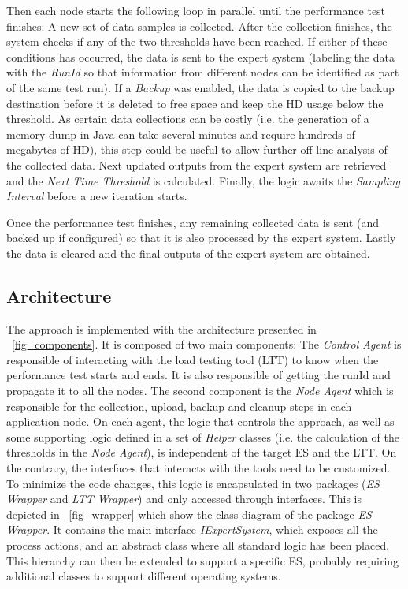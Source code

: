 \documentclass[runningheads,a4paper]{llncs}
\begin{document}

Then each node starts the following loop in parallel until the performance test
finishes: A new set of data samples is collected. After the collection finishes,
the system checks if any of the two thresholds have been reached. If either of
these conditions has occurred, the data is sent to the expert system (labeling the 
data with the \emph{RunId} so that information from different nodes can be
identified as part of the same test run). If a \emph{Backup} was enabled, the data 
is copied to the backup destination before it is deleted to free space and keep
the HD usage below the threshold. As certain data collections can be costly (i.e. 
the generation of a memory dump in Java can take several minutes and require
hundreds of megabytes of HD), this step could be useful to allow further off-line 
analysis of the collected data. Next updated outputs from the expert system are
retrieved and the \emph{Next Time Threshold} is calculated. Finally, the logic
awaits the \emph{Sampling Interval} before a new iteration starts.

Once the performance test finishes, any remaining collected data is sent (and
backed up if configured) so that it is also processed by the
expert system. Lastly the data is cleared and the final outputs of the expert system are obtained.

\vspace{-7pt}
\subsection{Architecture}
\vspace{-7pt}
The approach is implemented with the architecture
presented in \figurename ~\ref{fig_components}. It is composed of two main components:
The \emph{Control Agent} is responsible of interacting with the load
testing tool (LTT) to know when the performance test starts and ends.
It is also responsible of getting the runId and propagate it to all the nodes.
The second component is the \emph{Node Agent} which is responsible for the collection, upload, backup and cleanup steps 
in each application node. On each agent, the logic that controls the
approach, as well as some supporting logic defined in a set of \emph{Helper}
classes (i.e. the calculation of the thresholds in the \emph{Node Agent}), is
independent of the target ES and the LTT. On the contrary, the interfaces that
interacts with the tools need to be customized. To minimize the code changes,
this logic is encapsulated in two packages (\emph{ES Wrapper} and \emph{LTT
Wrapper}) and only accessed through interfaces. This is depicted in
\figurename ~\ref{fig_wrapper} which show the class diagram of the package \emph{ES Wrapper}.
It contains the main interface \emph{IExpertSystem}, which exposes all the
process actions, and an abstract class where all standard logic has been placed.
This hierarchy can then be extended to support a specific ES, probably requiring
additional classes to support different operating systems.
\end{document}
